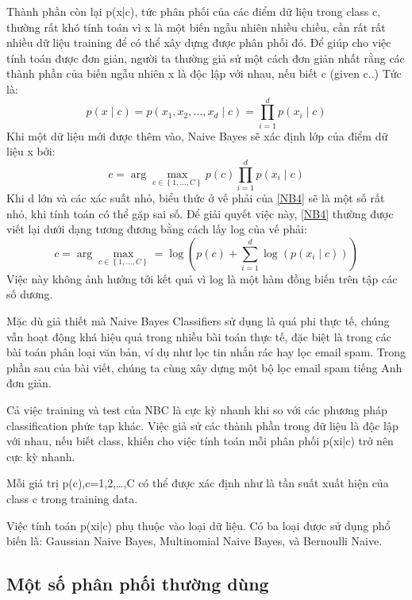 	Thành phần còn lại p(x|c), tức phân phối của các điểm dữ liệu trong class c, thường rất khó tính toán vì x là một biến ngẫu nhiên nhiều chiều, cần rất rất nhiều dữ liệu training để có thể xây dựng được phân phối đó. Để giúp cho việc tính toán được đơn giản, người ta thường giả sử một cách đơn giản nhất rằng các thành phần của biến ngẫu nhiên x là độc lập với nhau, nếu biết c (given c..) Tức là:
\begin{equation}
	p(x \mid c) = p(x_1,x_2,...,x_d \mid c) = \displaystyle \prod_{i=1}^d p(x_i \mid c)
\end{equation}
	Khi một dữ liệu mới được thêm vào, Naive Bayes sẽ xác định lớp của điểm dữ liệu x bởi:
\begin{equation}
	c = \arg\max_{c \in \left\{ 1,...,C\right\}} p(c) \prod_{i=1}^{d}p(x_i \mid c) 
	\label{NB4}
\end{equation}
Khi d lớn và các xác suất nhỏ, biểu thức ở vế phải của \ref{NB4} sẽ là một số rất nhỏ, khi tính toán có thể gặp sai số. Để giải quyết việc này, \ref{NB4} thường được viết lại dưới dạng tương đương bằng cách lấy log của vế phải:
 \begin{equation}
 	c = \arg\max_{c \in \left\{ 1,...,C\right\}} = \log(p(c) + \sum_{i=1}^{d}\log(p(x_i \mid c)))
 \end{equation}
	Việc này không ảnh hưởng tới kết quả vì log là một hàm đồng biến trên tập các số dương.
	 
	Mặc dù giả thiết mà Naive Bayes Classifiers sử dụng là quá phi thực tế, chúng vẫn hoạt động khá hiệu quả trong nhiều bài toán thực tế, đặc biệt là trong các bài toán phân loại văn bản, ví dụ như lọc tin nhắn rác hay lọc email spam. Trong phần sau của bài viết, chúng ta cùng xây dựng một bộ lọc email spam tiếng Anh đơn giản.
	 
	Cả việc training và test của NBC là cực kỳ nhanh khi so với các phương pháp classification phức tạp khác. Việc giả sử các thành phần trong dữ liệu là độc lập với nhau, nếu biết class, khiến cho việc tính toán mỗi phân phối p(xi|c) trở nên cực kỳ nhanh.
	 
	Mỗi giá trị p(c),c=1,2,…,C có thể được xác định như là tần suất xuất hiện của class c trong training data.
	 
	Việc tính toán p(xi|c) phụ thuộc vào loại dữ liệu. Có ba loại được sử dụng phổ biến là: Gaussian Naive Bayes, Multinomial Naive Bayes, và Bernoulli Naive.
\subsection{Một số phân phối thường dùng}
